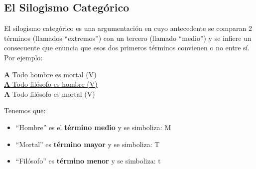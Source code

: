 \documentclass{article}
\begin{document}
 \subsection{El Silogismo Categórico}
 
 El silogismo categórico es una argumentación en cuyo antecedente se comparan 2 términos (llamados ``extremos'') con un tercero (llamado ``medio'') y se infiere un consecuente que enuncia que esos dos primeros términos convienen o no entre sí. Por ejemplo:
 
 \begin{center}
     \textbf{A} Todo hombre es mortal (V) \\
     \underline{\textbf{A} Todo filósofo es hombre (V)} \\
     \textbf{A} Todo filósofo es mortal (V) \\
 \end{center}
 
 Tenemos que:
 \begin{itemize}
     \item ``Hombre'' es el \textbf{término medio} y se simboliza: M
     \item ``Mortal'' es \textbf{término mayor} y se simboliza: T
     \item ``Filósofo'' es \textbf{término menor} y se simboliza: t
 \end{itemize}
 
\end{document}
